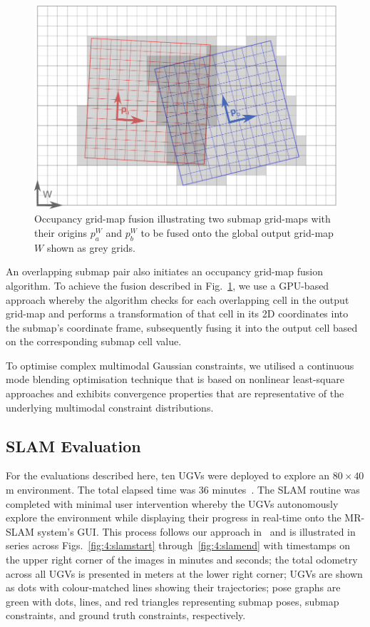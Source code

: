 \begin{figure}[H]
	\centering
	\includegraphics[width=0.7\linewidth]{fig5}
	\caption[Occupancy grid-map fusion]{Occupancy grid-map fusion illustrating two submap grid-maps with their origins $p^W_a$ and $p^W_b$ to be fused onto the global output grid-map $W$ shown as grey grids.}
	\label{fig:4:ogm}
\end{figure}

An overlapping submap pair also initiates an occupancy grid-map fusion algorithm. To achieve the fusion described in Fig.~\ref{fig:4:ogm}, we use a GPU-based approach whereby the algorithm checks for each overlapping cell in the output grid-map and performs a transformation of that cell in its 2D coordinates into the submap’s coordinate frame, subsequently fusing it into the output cell based on the corresponding submap cell value.

To optimise complex multimodal Gaussian constraints, we utilised a continuous mode blending optimisation technique that is based on nonlinear least-square approaches and exhibits convergence properties that are representative of the underlying multimodal constraint distributions.

\subsection{SLAM Evaluation}
For the evaluations described here, ten UGVs were deployed to explore an $80\times40$ m environment. The total elapsed time was 36 minutes~\cite{reid_large-scale_2016}. The SLAM routine was completed with minimal user intervention whereby the UGVs autonomously explore the environment while displaying their progress in real-time onto the MR-SLAM system’s GUI. This process follows our approach in~\cite{s._lopes_autonomous_2011} and is illustrated in series across Figs.~\ref{fig:4:slamstart} through~\ref{fig:4:slamend} with timestamps on the upper right corner of the images in minutes and seconds; the total odometry across all UGVs is presented in meters at the lower right corner; UGVs are shown as dots with colour-matched lines showing their trajectories; pose graphs are green with dots, lines, and red triangles representing submap poses, submap constraints, and ground truth constraints, respectively.

